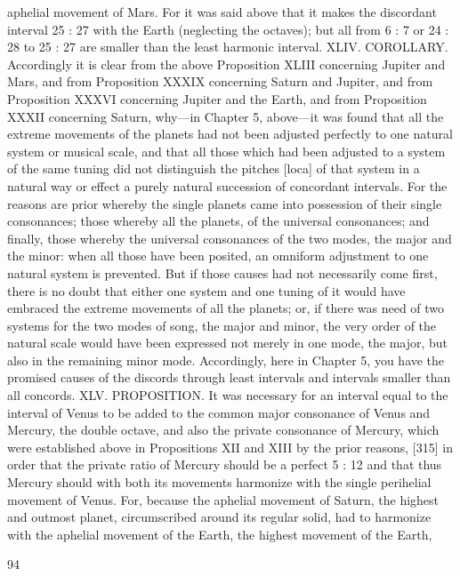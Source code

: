\documentclass{article}
\begin{document}
aphelial movement of Mars. For it was said above that it makes the
discordant interval 25 : 27 with the Earth (neglecting the octaves); but all
from 6 : 7 or 24 : 28 to 25 : 27 are smaller than the least harmonic
interval.
XLIV. COROLLARY. Accordingly it is clear from the above Proposition
XLIII concerning Jupiter and Mars, and from Proposition XXXIX
concerning Saturn and Jupiter, and from Proposition XXXVI concerning
Jupiter and the Earth, and from Proposition XXXII concerning Saturn,
why—in Chapter 5, above—it was found that all the extreme movements
of the planets had not been adjusted perfectly to one natural system or
musical scale, and that all those which had been adjusted to a system of
the same tuning did not distinguish the pitches [loca] of that system in a
natural way or effect a purely natural succession of concordant intervals.
For the reasons are prior whereby the single planets came into
possession of their single consonances; those whereby all the planets, of
the universal consonances; and finally, those whereby the universal
consonances of the two modes, the major and the minor: when all those
have been posited, an omniform adjustment to one natural system is
prevented. But if those causes had not necessarily come first, there is no
doubt that either one system and one tuning of it would have embraced
the extreme movements of all the planets; or, if there was need of two
systems for the two modes of song, the major and minor, the very order
of the natural scale would have been expressed not merely in one mode,
the major, but also in the remaining minor mode. Accordingly, here in
Chapter 5, you have the promised causes of the discords through least
intervals and intervals smaller than all concords.
XLV. PROPOSITION. It was necessary for an interval equal to the
interval of Venus to be added to the common major consonance of Venus
and Mercury, the double octave, and also the private consonance of
Mercury, which were established above in Propositions XII and XIII by
the prior reasons, [315] in order that the private ratio of Mercury should
be a perfect 5 : 12 and that thus Mercury should with both its movements
harmonize with the single perihelial movement of Venus.
For, because the aphelial movement of Saturn, the highest and outmost
planet, circumscribed around its regular solid, had to harmonize with the
aphelial movement of the Earth, the highest movement of the Earth,


94
\end{document}
